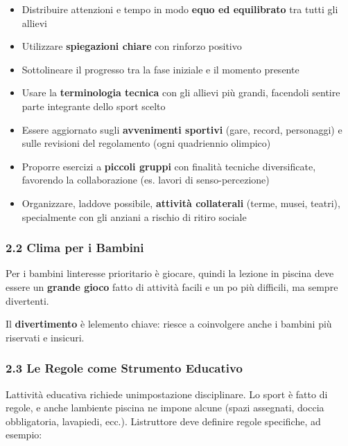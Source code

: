 \documentclass[a4paper,11pt]{article}
\providecommand{\tightlist}{%
  \setlength{\itemsep}{0pt}\setlength{\parskip}{0pt}}
\begin{document}
\begin{itemize}
      \tightlist
      \item
            Distribuire attenzioni e tempo in modo \textbf{equo ed equilibrato}
            tra tutti gli allievi
      \item
            Utilizzare \textbf{spiegazioni chiare} con rinforzo positivo
      \item
            Sottolineare il progresso tra la fase iniziale e il momento presente
      \item
            Usare la \textbf{terminologia tecnica} con gli allievi più grandi,
            facendoli sentire parte integrante dello sport scelto
      \item
            Essere aggiornato sugli \textbf{avvenimenti sportivi} (gare, record,
            personaggi) e sulle revisioni del regolamento (ogni quadriennio
            olimpico)
      \item
            Proporre esercizi a \textbf{piccoli gruppi} con finalità tecniche
            diversificate, favorendo la collaborazione (es. lavori di
            senso-percezione)
      \item
            Organizzare, laddove possibile, \textbf{attività collaterali} (terme,
            musei, teatri), specialmente con gli anziani a rischio di ritiro
            sociale
\end{itemize}

\subsubsection{2.2 Clima per i Bambini}\label{clima-per-i-bambini}

Per i bambini l\textquotesingle interesse prioritario è giocare, quindi
la lezione in piscina deve essere un \textbf{grande gioco} fatto di
attività facili e un po\textquotesingle{} più difficili, ma sempre
divertenti.

Il \textbf{divertimento} è l\textquotesingle elemento chiave: riesce a
coinvolgere anche i bambini più riservati e insicuri.

\subsubsection{2.3 Le Regole come Strumento
      Educativo}\label{le-regole-come-strumento-educativo}

L\textquotesingle attività educativa richiede
un\textquotesingle impostazione disciplinare. Lo sport è fatto di
regole, e anche l\textquotesingle ambiente piscina ne impone alcune
(spazi assegnati, doccia obbligatoria, lavapiedi, ecc.).
L\textquotesingle istruttore deve definire regole specifiche, ad
esempio:
\end{document}
